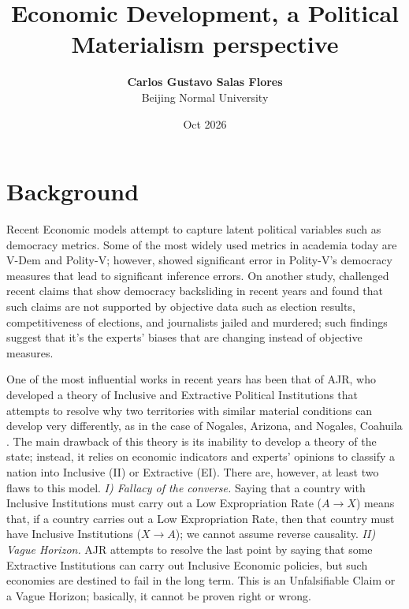 \documentclass[11pt]{article}
\title{\textbf{Economic Development, a Political Materialism perspective}}
\author{\textbf{Carlos Gustavo Salas Flores} \\ \small Beijing Normal University}
\date{Oct 2026}
\begin{document}
\maketitle



\section{Background}
\label{sec:background}


Recent Economic models attempt to capture latent political variables such as democracy metrics. Some of the most widely used metrics in academia today are V-Dem and Polity-V; however, \textcite{treier_jackman_2008} showed significant error in Polity-V's democracy measures that lead to significant inference errors. On another study, \textcite{little_meng_2024} challenged recent claims that show democracy backsliding in recent years and found that such claims are not supported by objective data such as election results, competitiveness of elections, and journalists jailed and murdered; such findings suggest that it's the experts' biases that are changing instead of objective measures.


One of the most influential works in recent years has been that of AJR, who developed a theory of Inclusive and Extractive Political Institutions that attempts to resolve why two territories with similar material conditions can develop very differently, as in the case of Nogales, Arizona, and Nogales, Coahuila \parencite{acemoglu_johnson_robinson_2001,acemoglu_johnson_robinson_2005,acemoglu_robinson_2012}. The main drawback of this theory is its inability to develop a theory of the state; instead, it relies on economic indicators and experts’ opinions to classify a nation into Inclusive (II) or Extractive (EI). There are, however, at least two flaws to this model. \textit{I) Fallacy of the converse.} Saying that a country with Inclusive Institutions must carry out a Low Expropriation Rate ($A \to X$) means that, if a country carries out a Low Expropriation Rate, then that country must have Inclusive Institutions ($X \to A$); we cannot assume reverse causality. \textit{II) Vague Horizon.} AJR attempts to resolve the last point by saying that some Extractive Institutions can carry out Inclusive Economic policies, but such economies are destined to fail in the long term. This is an Unfalsifiable Claim or a Vague Horizon; basically, it cannot be proven right or wrong.
\end{document}
